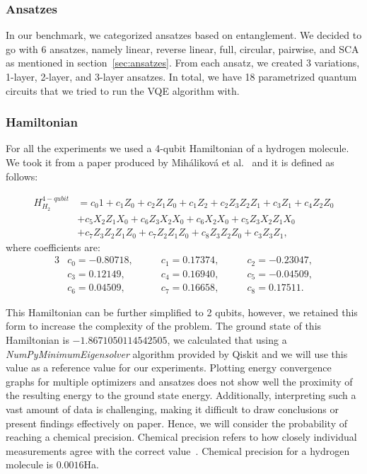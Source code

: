 \subsubsection{Ansatzes}
In our benchmark, we categorized ansatzes based on entanglement. We decided to go with 6 ansatzes, namely linear, reverse linear, full, circular, pairwise, and SCA as mentioned in section~\ref{sec:ansatzes}. From each ansatz, we created 3 variations, 1-layer, 2-layer, and 3-layer ansatzes. In total, we have 18 parametrized quantum circuits that we tried to run the VQE algorithm with.

\subsubsection{Hamiltonian}
For all the experiments we used a 4-qubit Hamiltonian of a hydrogen molecule. We took it from a paper produced by Miháliková et al.~\cite{mihalikova} and it is defined as follows:

\begin{align*}H_{H_2}^{4-qubit} &= c_{0}1 + c_{1}Z_{0} + c_{2}Z_{1}Z_{0} + c_{1}Z_{2} + c_{2}Z_{3}Z_{2}Z_{1} + c_{3}Z_{1} + c_{4}Z_{2}Z_{0}\\
                                &+ c_{5}X_{2}Z_{1}X_{0} + c_{6}Z_{3}X_{2}X_{0} + c_{6}X_{2}X_{0} + c_{5}Z_{3}X_{2}Z_{1}X_{0}\\
                                &+c_{7}Z_{3}Z_{2}Z_{1}Z_{0} + c_{7}Z_{2}Z_{1}Z_{0} + c_{8}Z_{3}Z_{2}Z_{0} + c_{3}Z_{3}Z_{1}\text{,}
\end{align*}
where coefficients are:
\begin{alignat*}{3}
    &c_0 = -0.80718,\qquad &c_1 = 0.17374,\qquad &c_2 =-0.23047, \\
    &c_3 = 0.12149,\qquad  &c_4 = 0.16940,\qquad &c_5 = -0.04509, \\
    &c_6 = 0.04509,\qquad  &c_7 = 0.16658,\qquad &c_8 = 0.17511.
\end{alignat*}

This Hamiltonian can be further simplified to 2 qubits, however, we retained this form to increase the complexity of the problem. The ground state of this Hamiltonian is $-1.8671050114542505$, we calculated that using a \textit{NumPyMinimumEigensolver} algorithm provided by Qiskit and we will use this value as a reference value for our experiments. Plotting energy convergence graphs for multiple optimizers and ansatzes does not show well the proximity of the resulting energy to the ground state energy. Additionally, interpreting such a vast amount of data is challenging, making it difficult to draw conclusions or present findings effectively on paper. Hence, we will consider the probability of reaching a chemical precision. Chemical precision refers to how closely individual measurements agree with the correct value~\cite{chemistry}. Chemical precision for a hydrogen molecule is $0.0016$Ha. 

